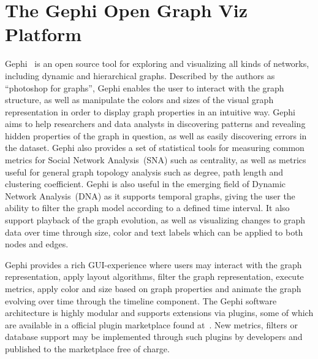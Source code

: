 \section{The Gephi Open Graph Viz Platform} Gephi~\cite{ICWSM09154} is
an open source tool for exploring and visualizing all kinds of networks,
including dynamic and hierarchical graphs. Described by the authors as
``photoshop for graphs'', Gephi enables the user to interact with the
graph structure, as well as manipulate the colors and sizes of the
visual graph representation in order to display graph properties in an
intuitive way. Gephi aims to help researchers and data analysts in
discovering patterns and revealing hidden properties of the graph in
question, as well as easily discovering errors in the dataset. Gephi
also provides a set of statistical tools for measuring common metrics
for Social Network Analysis~(SNA) such as centrality, as well as metrics
useful for general graph topology analysis such as degree, path length
and clustering coefficient. Gephi is also useful in the emerging field of
Dynamic Network Analysis~(DNA)  as it supports temporal graphs,
giving the user the ability to filter the graph model according to a
defined time interval. It also support playback of the graph evolution,
as well as visualizing changes to graph data over time through size,
color and text labels which can be applied to both nodes and edges.

Gephi provides a rich GUI-experience where users may interact with the
graph representation, apply layout algorithms, filter the graph
representation, execute metrics, apply color and size based on graph
properties and animate the graph evolving over time through the timeline
component.  The Gephi software architecture is highly modular and
supports extensions via plugins, some of which are available in a
official plugin marketplace found at~\cite{gephimarketplace}. New
metrics, filters or database support may be implemented through such
plugins by developers and published to the marketplace free of charge.

